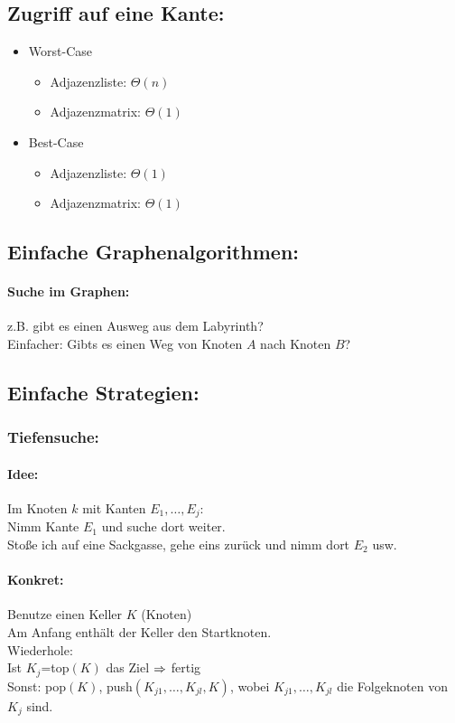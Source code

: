 \documentclass[a4paper]{scrartcl}
\begin{document}
\subsection{Zugriff auf eine Kante: }
\begin{itemize}
	\item Worst-Case
	\begin{itemize}
		\item Adjazenzliste: $\Theta(n)$
		\item Adjazenzmatrix: $\Theta(1)$
	\end{itemize}
	\item Best-Case
	\begin{itemize}
		\item Adjazenzliste: $\Theta(1)$
		\item Adjazenzmatrix: $\Theta(1)$
	\end{itemize}
\end{itemize}

\subsection{Einfache Graphenalgorithmen: }
\paragraph{Suche im Graphen: } z.B. gibt es einen Ausweg aus dem Labyrinth?\\
Einfacher: Gibts es einen Weg von Knoten $A$ nach Knoten $B$?
\subsection{Einfache Strategien: }
\subsubsection{Tiefensuche: }
\paragraph{Idee: } Im Knoten $k$ mit Kanten $E_1,\ldots,E_j$:\\
Nimm Kante $E_1$ und suche dort weiter.\\
Stoße ich auf eine Sackgasse, gehe eins zurück und nimm dort $E_2$ usw.
\paragraph{Konkret: } Benutze einen Keller $K$ (Knoten)\\
Am Anfang enthält der Keller den Startknoten.\\
Wiederhole:\\
Ist $K_j$=top$(K)$ das Ziel $\Rightarrow$ fertig\\
Sonst: pop$(K)$, push$(K_{j1},\ldots,K_{jl},K)$, wobei $K_{j1},\ldots,K_{jl}$ die Folgeknoten von $K_j$ sind.
\end{document}
